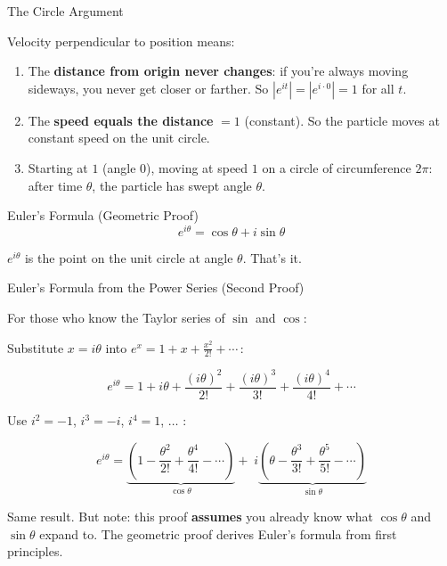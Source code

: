 \documentclass[10pt]{beamer}
\theoremstyle{definition}
\newcommand{\x}[1]{\alert{\textbf{#1}}}
\begin{document}
\begin{frame}[shrink=3]{The Circle Argument}

Velocity perpendicular to position means:

\vfill

\begin{enumerate}
\item The \x{distance from origin never changes}: if you're always moving sideways, you never get closer or farther. So $|e^{it}| = |e^{i\cdot 0}| = 1$ for all $t$.

\vfill\pause

\item The \x{speed equals the distance} $= 1$ (constant). So the particle moves at constant speed on the unit circle.

\vfill\pause

\item Starting at $1$ (angle $0$), moving at speed $1$ on a circle of circumference $2\pi$: after time $\theta$, the particle has swept angle $\theta$.
\end{enumerate}

\vfill\pause

\begin{block}{Euler's Formula (Geometric Proof)}
$$\boxed{e^{i\theta} = \cos\theta + i\sin\theta}$$
\end{block}

$e^{i\theta}$ is the point on the unit circle at angle $\theta$. That's it.

\end{frame}


\begin{frame}{Euler's Formula from the Power Series (Second Proof)}

For those who know the Taylor series of $\sin$ and $\cos$:

\vfill

Substitute $x = i\theta$ into $e^x = 1 + x + \frac{x^2}{2!} + \cdots$\,:

$$e^{i\theta} = 1 + i\theta + \frac{(i\theta)^2}{2!} + \frac{(i\theta)^3}{3!} + \frac{(i\theta)^4}{4!} + \cdots$$

\vfill\pause

Use $i^2 = -1$, \; $i^3 = -i$, \; $i^4 = 1$, \; $\ldots$ \;:

$$e^{i\theta} = \underbrace{\left(1 - \frac{\theta^2}{2!} + \frac{\theta^4}{4!} - \cdots\right)}_{\cos\theta} + \; i\underbrace{\left(\theta - \frac{\theta^3}{3!} + \frac{\theta^5}{5!} - \cdots\right)}_{\sin\theta}$$

\vfill\pause

Same result. But note: this proof \x{assumes} you already know what $\cos\theta$ and $\sin\theta$ expand to. The geometric proof derives Euler's formula from first principles.

\end{frame}
\end{document}
